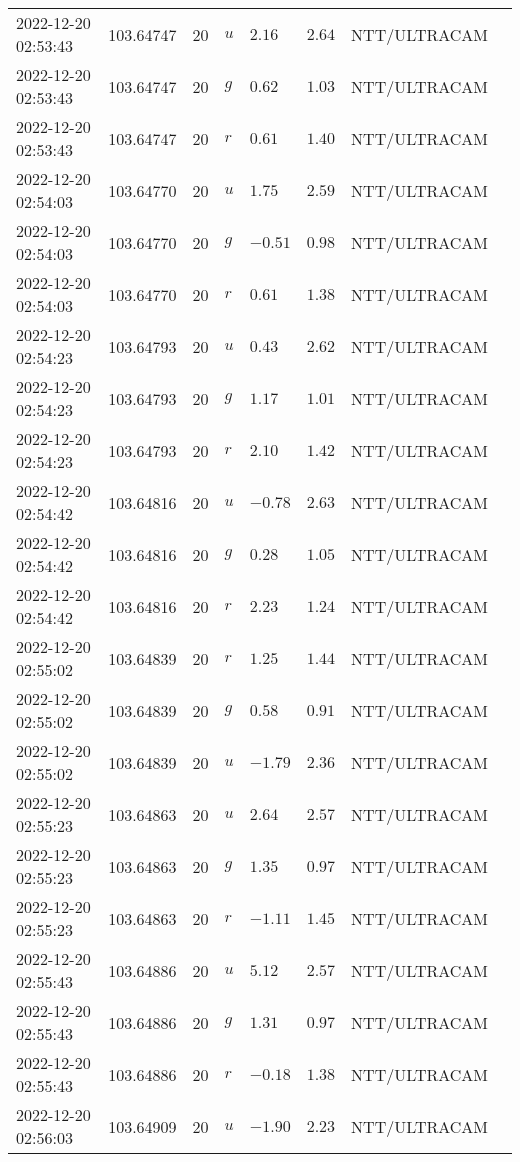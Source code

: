 \documentclass{nature_plusfigure}
\begin{document}
\begin{supplement}
\begin{center}
\begin{longtable}{llllllll}
2022-12-20 02:53:43 & 103.64747 & 20 & $u$ & $2.16$ & $2.64$ & NTT/ULTRACAM &  \\ 
2022-12-20 02:53:43 & 103.64747 & 20 & $g$ & $0.62$ & $1.03$ & NTT/ULTRACAM &  \\ 
2022-12-20 02:53:43 & 103.64747 & 20 & $r$ & $0.61$ & $1.40$ & NTT/ULTRACAM &  \\ 
2022-12-20 02:54:03 & 103.64770 & 20 & $u$ & $1.75$ & $2.59$ & NTT/ULTRACAM &  \\ 
2022-12-20 02:54:03 & 103.64770 & 20 & $g$ & $-0.51$ & $0.98$ & NTT/ULTRACAM &  \\ 
2022-12-20 02:54:03 & 103.64770 & 20 & $r$ & $0.61$ & $1.38$ & NTT/ULTRACAM &  \\ 
2022-12-20 02:54:23 & 103.64793 & 20 & $u$ & $0.43$ & $2.62$ & NTT/ULTRACAM &  \\ 
2022-12-20 02:54:23 & 103.64793 & 20 & $g$ & $1.17$ & $1.01$ & NTT/ULTRACAM &  \\ 
2022-12-20 02:54:23 & 103.64793 & 20 & $r$ & $2.10$ & $1.42$ & NTT/ULTRACAM &  \\ 
2022-12-20 02:54:42 & 103.64816 & 20 & $u$ & $-0.78$ & $2.63$ & NTT/ULTRACAM &  \\ 
2022-12-20 02:54:42 & 103.64816 & 20 & $g$ & $0.28$ & $1.05$ & NTT/ULTRACAM &  \\ 
2022-12-20 02:54:42 & 103.64816 & 20 & $r$ & $2.23$ & $1.24$ & NTT/ULTRACAM &  \\ 
2022-12-20 02:55:02 & 103.64839 & 20 & $r$ & $1.25$ & $1.44$ & NTT/ULTRACAM &  \\ 
2022-12-20 02:55:02 & 103.64839 & 20 & $g$ & $0.58$ & $0.91$ & NTT/ULTRACAM &  \\ 
2022-12-20 02:55:02 & 103.64839 & 20 & $u$ & $-1.79$ & $2.36$ & NTT/ULTRACAM &  \\ 
2022-12-20 02:55:23 & 103.64863 & 20 & $u$ & $2.64$ & $2.57$ & NTT/ULTRACAM &  \\ 
2022-12-20 02:55:23 & 103.64863 & 20 & $g$ & $1.35$ & $0.97$ & NTT/ULTRACAM &  \\ 
2022-12-20 02:55:23 & 103.64863 & 20 & $r$ & $-1.11$ & $1.45$ & NTT/ULTRACAM &  \\ 
2022-12-20 02:55:43 & 103.64886 & 20 & $u$ & $5.12$ & $2.57$ & NTT/ULTRACAM &  \\ 
2022-12-20 02:55:43 & 103.64886 & 20 & $g$ & $1.31$ & $0.97$ & NTT/ULTRACAM &  \\ 
2022-12-20 02:55:43 & 103.64886 & 20 & $r$ & $-0.18$ & $1.38$ & NTT/ULTRACAM &  \\ 
2022-12-20 02:56:03 & 103.64909 & 20 & $u$ & $-1.90$ & $2.23$ & NTT/ULTRACAM &  \\ 

\end{longtable}
\end{center}
\end{supplement}
\end{document}
